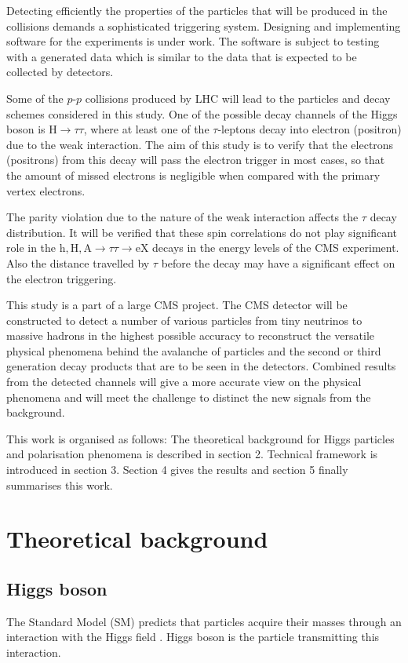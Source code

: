 \documentclass[a4paper,12pt,titlepage]{article}
\begin{document}
Detecting efficiently the properties of the particles that will be produced in the collisions demands a sophisticated triggering system.
Designing and implementing software for the experiments is under work. The software is subject to testing with a generated data which is similar to the data that is expected to be collected by detectors.

Some of the $p$-$p$ collisions produced by LHC will lead to the particles and decay schemes considered in this study. One of the possible decay channels of the Higgs boson is $\mathrm{H} \rightarrow \tau \tau$, where at least one of the $\tau$-leptons decay into electron (positron) due to the weak interaction. The aim of this study is to verify that the electrons (positrons) from this decay will pass the electron trigger in most cases, so that the amount of missed electrons is negligible when compared with the primary vertex electrons.

The parity violation due to the nature of the weak interaction affects the $\tau$ decay distribution. It will be verified that these spin correlations do not play significant role in the $\mathrm{h, H, A} \rightarrow \tau \tau \rightarrow \mathrm{eX}$ decays in the energy levels of the CMS experiment. Also the distance travelled by $\tau$ before the decay may have a significant effect on the electron triggering. 

This study is a part of a large CMS project. The CMS detector will be constructed to detect a number of various particles from tiny neutrinos to massive hadrons in the highest possible accuracy to reconstruct the versatile physical phenomena behind the avalanche of particles and the second or third generation decay products that are to be seen in the detectors. 
Combined results from the detected channels will give a more accurate view on the physical phenomena and will meet the challenge to distinct the new signals from the background. 

This work is organised as follows: The theoretical background for Higgs particles and polarisation phenomena is described in section 2. Technical framework is introduced in section 3. Section 4 gives the results and section 5 finally summarises this work.  
 
\pagebreak

\section{Theoretical background}
\subsection{Higgs boson}
The Standard Model (SM) \cite{SM} predicts that particles acquire their masses through an interaction with the Higgs field \cite{HHunter, HMechanism}. Higgs boson is the particle transmitting this interaction. 
\end{document}
